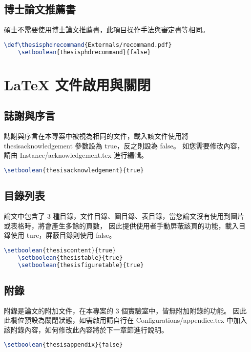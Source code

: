 \subsection*{博士論文推薦書}
碩士不需要使用博士論文推薦書，此項目操作手法與審定書等相同。
\begin{lstlisting}[language=TeX]
    \def\thesisphdrecommand{Externals/recommand.pdf}
    \setboolean{thesisphdrecommand}{false}
\end{lstlisting}

\section{LaTeX 文件啟用與關閉}

\subsection*{誌謝與序言}

誌謝與序言在本專案中被視為相同的文件，載入該文件使用將 thesisacknowledgement 參數設為 true，反之則設為 false。
如您需要修改內容，請由 Instance/acknowledgement.tex 進行編輯。

\begin{lstlisting}[language=TeX]
    \setboolean{thesisacknowledgement}{true}
\end{lstlisting}

\subsection*{目錄列表}

論文中包含了 3 種目錄，文件目錄、圖目錄、表目錄，當您論文沒有使用到圖片或表格時，將會產生多餘的頁數，
因此提供使用者手動屏蔽該頁的功能，載入目錄使用 ture，屏蔽目錄則使用 false。

\begin{lstlisting}[language=TeX]
    \setboolean{thesiscontent}{true}
    \setboolean{thesistable}{true}
    \setboolean{thesisfiguretable}{true}
\end{lstlisting}

\subsection*{附錄}

附錄是論文的附加文件，在本專案的 3 個實驗室中，皆無附加附錄的功能。
因此此欄位預設為關閉狀態，如需啟用請自行在 Configurations/appendice.tex 中加入該附錄內容，如何修改此內容將於下一章節進行說明。

\begin{lstlisting}[language=TeX]
    \setboolean{thesisappendix}{false}
\end{lstlisting}
